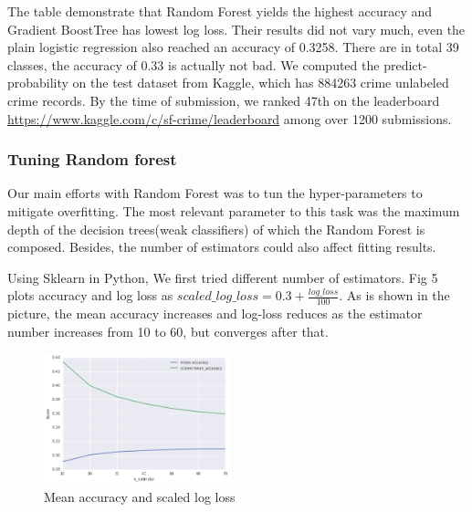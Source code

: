 \documentclass[11pt,conference]{IEEEtran}
\begin{document}
The table demonstrate that Random Forest yields the highest accuracy and Gradient BoostTree has lowest log loss. Their results did not vary much, even the plain logistic regression also reached an accuracy of 0.3258. There are in total 39 classes, the accuracy of 0.33 is actually not bad. We computed the predict-probability on the test dataset from Kaggle, which has 884263 crime unlabeled crime records. By the time of submission, we ranked 47th on the leaderboard \url{https://www.kaggle.com/c/sf-crime/leaderboard} among over 1200 submissions. 

\subsubsection{Tuning Random forest}
Our main efforts with Random Forest was to tun the hyper-parameters to mitigate overfitting. The most relevant parameter to this task was the maximum depth of the decision trees(weak classifiers)  of which the Random Forest is composed. Besides, the number of estimators could also affect fitting results.

Using Sklearn in Python, We first tried different number of estimators. Fig 5 plots accuracy and log loss as $scaled\_log\_loss = 0.3 + \frac{log\_loss}{100}$. As is shown in the picture, the mean accuracy increases and log-loss reduces as the estimator number increases from 10 to 60, but converges after that.
\begin{figure}[H]
\begin{center}
\includegraphics [width=0.48\textwidth]{pics/rf_p1.png}
\caption{Mean accuracy and scaled log loss}
\end{center}
\end{figure}
\end{document}

